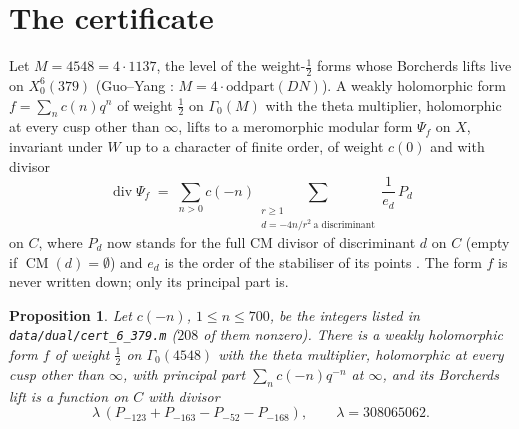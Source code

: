 \documentclass[11pt,reqno]{amsart}
\theoremstyle{plain}
\newtheorem{proposition}[theorem]{Proposition}
\theoremstyle{definition}
\DeclareMathOperator{\CM}{CM}
\begin{document}
\section{The certificate}

Let $M=4548=4\cdot1137$, the level of the weight-$\tfrac12$ forms whose Borcherds lifts live on
$X_0^6(379)$ (Guo--Yang \cite{gy}: $M=4\cdot\mathrm{oddpart}(DN)$). A weakly holomorphic form
$f=\sum_nc(n)q^n$ of weight $\tfrac12$ on $\Gamma_0(M)$ with the theta multiplier, holomorphic at
every cusp other than $\infty$, lifts to a meromorphic modular form $\Psi_f$ on $X$, invariant
under $W$ up to a character of finite order, of weight $c(0)$ and with divisor
\begin{equation}\label{eq:div}
\operatorname{div}\Psi_f \;=\; \sum_{n>0}c(-n)\sum_{\substack{r\ge1\\ d=-4n/r^2\ \text{a discriminant}}}
\frac1{e_d}\,P_d
\end{equation}
on $C$, where $P_d$ now stands for the full CM divisor of discriminant $d$ on $C$ (empty if
$\CM(d)=\emptyset$) and $e_d$ is the order of the stabiliser of its points \cite[Lemma~25]{gy}. The
form $f$ is never written down; only its principal part is.

\begin{proposition}\label{prop:cert}
Let $c(-n)$, $1\le n\le700$, be the integers listed in \texttt{data/dual/cert\_6\_379.m} ($208$
of them nonzero). There is a weakly holomorphic form $f$ of weight $\tfrac12$ on $\Gamma_0(4548)$
with the theta multiplier, holomorphic at every cusp other than $\infty$, with principal part
$\sum_nc(-n)q^{-n}$ at $\infty$, and its Borcherds lift is a function on $C$ with divisor
\[
\lambda\,(P_{-123}+P_{-163}-P_{-52}-P_{-168}),\qquad \lambda=308065062 .
\]
\end{proposition}
\end{document}
